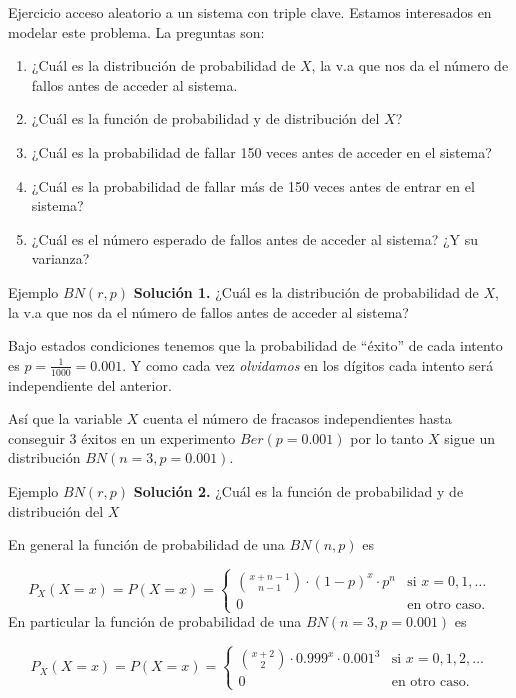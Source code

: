 \documentclass[
  ignorenonframetext,
  aspectratio=169]{beamer}
\providecommand{\tightlist}{%
  \setlength{\itemsep}{0pt}\setlength{\parskip}{0pt}}\usepackage{longtable,booktabs,array}
\begin{document}
\begin{frame}{Ejercicio acceso aleatorio a un sistema con triple clave.}
\protect\hypertarget{ejercicio-acceso-aleatorio-a-un-sistema-con-triple-clave.-1}{}
Estamos interesados en modelar este problema. La preguntas son:

\begin{enumerate}
\tightlist
\item
  ¿Cuál es la distribución de probabilidad de \(X\), la v.a que nos da
  el número de fallos antes de acceder al sistema.
\item
  ¿Cuál es la función de probabilidad y de distribución del \(X\)?
\item
  ¿Cuál es la probabilidad de fallar 150 veces antes de acceder en el
  sistema?
\item
  ¿Cuál es la probabilidad de fallar más de 150 veces antes de entrar en
  el sistema?
\item
  ¿Cuál es el número esperado de fallos antes de acceder al sistema? ¿Y
  su varianza?
\end{enumerate}
\end{frame}

\begin{frame}{Ejemplo \(BN(r,p)\)}
\protect\hypertarget{ejemplo-bnrp}{}
\textbf{Solución 1.} ¿Cuál es la distribución de probabilidad de \(X\),
la v.a que nos da el número de fallos antes de acceder al sistema?

Bajo estados condiciones tenemos que la probabilidad de ``éxito'' de
cada intento es \(p=\frac{1}{1000}=0.001\). Y como cada vez
\emph{olvidamos} en los dígitos cada intento será independiente del
anterior.

Así que la variable \(X\) cuenta el número de fracasos independientes
hasta conseguir 3 éxitos en un experimento \(Ber(p=0.001)\) por lo tanto
\(X\) sigue un distribución \(BN(n=3,p=0.001).\)
\end{frame}

\begin{frame}{Ejemplo \(BN(r,p)\)}
\protect\hypertarget{ejemplo-bnrp-1}{}
\textbf{Solución 2.} ¿Cuál es la función de probabilidad y de
distribución del \(X\)

En general la función de probabilidad de una \(BN(n,p)\) es

\[
P_X(X=x)=P(X=x)=
\left\{
\begin{array}{cc} 
{x+n-1\choose n-1} \cdot (1-p)^{x}\cdot p^n & \mbox{si }  x=0,1,\ldots \\ 0 & \mbox{en otro caso.}\end{array}\right.
\] En particular la función de probabilidad de una \(BN(n=3,p=0.001)\)
es

\[
P_X(X=x)=P(X=x)=
\left\{
\begin{array}{cc} 
{x+2\choose 2} \cdot 0.999^{x}\cdot 0.001^3 & \mbox{si }  x=0,1,2,\ldots \\ 0 & \mbox{en otro caso.}\end{array}\right.
\]
\end{frame}
\end{document}
